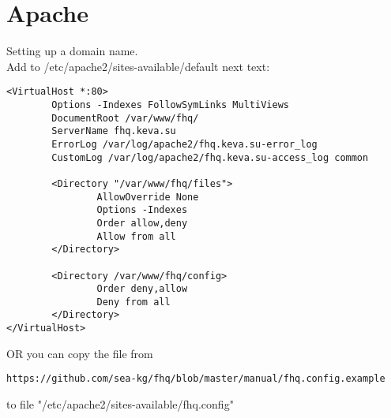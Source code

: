 \section{Apache}
\par

Setting up a domain name. \\
Add to /etc/apache2/sites-available/default next text:

\begin{Verbatim}[frame=single]
<VirtualHost *:80>
        Options -Indexes FollowSymLinks MultiViews
        DocumentRoot /var/www/fhq/
        ServerName fhq.keva.su
        ErrorLog /var/log/apache2/fhq.keva.su-error_log
        CustomLog /var/log/apache2/fhq.keva.su-access_log common

        <Directory "/var/www/fhq/files">
                AllowOverride None
                Options -Indexes
                Order allow,deny
                Allow from all
        </Directory>

        <Directory /var/www/fhq/config>
                Order deny,allow
                Deny from all
        </Directory>
</VirtualHost>
\end{Verbatim}

OR you can copy the file from
\begin{Verbatim}[frame=single]
https://github.com/sea-kg/fhq/blob/master/manual/fhq.config.example
\end{Verbatim}
to file "/etc/apache2/sites-available/fhq.config"
